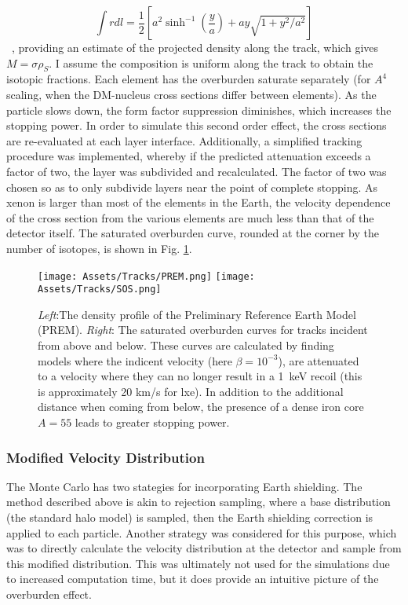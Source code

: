    \begin{equation}
   \int r dl    = \frac{1}{2}[a^2   \sinh^{-1}(\frac{y}{a}) + ay \sqrt{1 + y^2/a^2}]
   \end{equation}~,
\noindent
providing an estimate of the projected density along the track, which gives $M=\sigma \rho_S$.
I assume the composition is uniform along the track to obtain the isotopic fractions.
Each element has the overburden saturate separately (for $A^4$ scaling, when the DM-nucleus cross sections differ between elements).
As the particle slows down, the form factor suppression diminishes, which increases the stopping power.
In order to simulate this second order effect, the cross sections are re-evaluated at each layer interface.
Additionally, a simplified tracking procedure was implemented, whereby if the predicted attenuation exceeds a factor of two, the layer was subdivided and recalculated.
The factor of two was chosen so as to only subdivide layers near the point of complete stopping.
As xenon is larger than most of the elements in the Earth, the velocity dependence of the cross section from the various elements are much less than that of the detector itself.
The saturated overburden curve, rounded at the corner by the number of isotopes, is shown in Fig. \ref{fig:prem_density}.
\begin{figure}
    \centering
    \texttt{[image: Assets/Tracks/PREM.png]}
        \texttt{[image: Assets/Tracks/SOS.png]}
    \caption[Earth shielding effect simulations with DMCalc.]%
    {\textit{Left}:The density profile of the Preliminary Reference Earth  Model (PREM).
    \textit{Right}: The saturated overburden curves for tracks incident from above and below.
    These curves are calculated by finding models where the indicent velocity (here $\beta = 10^{-3}$), are attenuated to a velocity where they can no longer result in a 1~keV recoil (this is approximately 20 km/s for lxe).
    In addition to the additional distance when coming from below, the presence of a dense iron core $A=55$ leads to greater stopping power.}
    \label{fig:prem_density}
\end{figure}

\subsubsection {Modified Velocity Distribution}

The Monte Carlo has two stategies for incorporating Earth shielding.
The method described above is akin to rejection sampling, where a base distribution (the standard halo model\cite{mccabe_earths_2014}) is sampled, then the Earth shielding correction is applied to each particle.
Another strategy was considered for this purpose, which was to directly calculate the velocity distribution at the detector and sample from this modified distribution.
This was ultimately not used for the simulations due to increased computation time, but it does provide an intuitive picture of the overburden effect.

